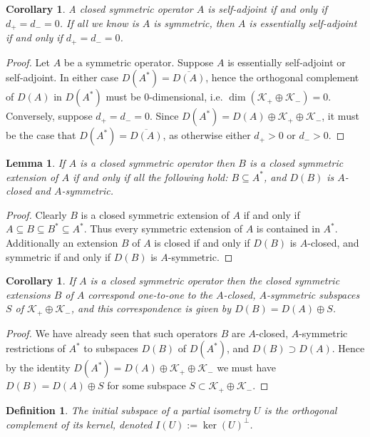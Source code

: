\documentclass[12pt,oneside]{report}
\newtheorem{cor}[thm]{Corollary}
\newtheorem{lem}[thm]{Lemma}
\newtheorem{defn}[thm]{Definition}
\begin{document}
\begin{cor}
    A closed symmetric operator $A$ is self-adjoint if and only if $d_{+} = d_{-} = 0$. If all we know is $A$ is symmetric, then $A$ is essentially self-adjoint if and only if $d_{+} = d_{-} = 0$.
\end{cor}
\begin{proof}
    Let $A$ be a symmetric operator. Suppose $A$ is essentially self-adjoint or self-adjoint. In either case $D(A^{*}) = \overline{D(A)}$, hence the orthogonal complement of $D(A)$ in $D(A^{*})$ must be $0$-dimensional, i.e. $\dim(\mathscr{K}_{+} \oplus \mathscr{K}_{-}) = 0$. Conversely, suppose $d_{+} = d_{-} = 0$. Since $D(A^{*}) = D(A) \oplus \mathscr{K}_{+} \oplus \mathscr{K}_{-}$, it must be the case that $D(A^{*}) = \overline{D(A)}$, as otherwise either $d_{+} > 0$ or $d_{-} > 0$.
\end{proof}

\begin{lem}
    If $A$ is a closed symmetric operator then $B$ is a closed symmetric extension of $A$ if and only if all the following hold: $B \subseteq A^{*}$, and $D(B)$ is $A$-closed and $A$-symmetric.
\end{lem}
\begin{proof}
    Clearly $B$ is a closed symmetric extension of $A$ if and only if $A \subseteq B \subseteq B^{*} \subseteq A^{*}$. Thus every symmetric extension of $A$ is contained in $A^{*}$. Additionally an extension $B$ of $A$ is closed if and only if $D(B)$ is $A$-closed, and symmetric if and only if $D(B)$ is $A$-symmetric.
\end{proof}

\begin{cor}
    If $A$ is a closed symmetric operator then the closed symmetric extensions $B$ of $A$ correspond one-to-one to the $A$-closed, $A$-symmetric subspaces $S$ of $\mathscr{K}_{+} \oplus \mathscr{K}_{-}$, and this correspondence is given by $D(B) = D(A) \oplus S$.
\end{cor}
\begin{proof}
    We have already seen that such operators $B$ are $A$-closed, $A$-symmetric restrictions of $A^{*}$ to subspaces $D(B)$ of $D(A^{*})$, and $D(B) \supset D(A)$. Hence by the identity $D(A^{*}) = D(A) \oplus \mathscr{K}_{+} \oplus \mathscr{K}_{-}$ we must have $D(B) = D(A) \oplus S$ for some subspace $S \subset \mathscr{K}_{+} \oplus \mathscr{K}_{-}$.
\end{proof}

\begin{defn}
    The initial subspace of a partial isometry $U$ is the orthogonal complement of its kernel, denoted $I(U) := \ker(U)^{\perp}$.
\end{defn}
\end{document}
